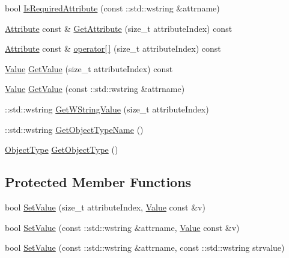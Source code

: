 \begin{DoxyCompactItemize}
\item 
bool \hyperlink{class_c_graph_object_ada27d286c916647eb2b3ec7849e4f16b}{Is\+Required\+Attribute} (const \+::std\+::wstring \&attrname)
\item 
\hyperlink{class_attribute}{Attribute} const \& \hyperlink{class_c_graph_object_a1a249af413ce2325356ef5f9227347ca}{Get\+Attribute} (size\+\_\+t attribute\+Index) const 
\item 
\hyperlink{class_attribute}{Attribute} const \& \hyperlink{class_c_graph_object_a5d8297161392a658c96bea8c8547ca56}{operator\mbox{[}$\,$\mbox{]}} (size\+\_\+t attribute\+Index) const 
\item 
\hyperlink{class_value}{Value} \hyperlink{class_c_graph_object_a3b70297c6692855c1860a826ed31322c}{Get\+Value} (size\+\_\+t attribute\+Index) const 
\item 
\hyperlink{class_value}{Value} \hyperlink{class_c_graph_object_acaecc482dbd4fdc46c50c549041c4306}{Get\+Value} (const \+::std\+::wstring \&attrname)
\item 
\+::std\+::wstring \hyperlink{class_c_graph_object_ab0d003173c2a0ebbd97b72d307c6b1d6}{Get\+W\+String\+Value} (size\+\_\+t attribute\+Index)
\item 
\+::std\+::wstring \hyperlink{class_c_graph_object_afd44cd57cf3abc44bc88499487586a4e}{Get\+Object\+Type\+Name} ()
\item 
\hyperlink{_object_database_defines_8h_a842c5e2e69277690b064bf363c017980}{Object\+Type} \hyperlink{class_c_graph_object_a744507195862d2d4ed6aed9fba55b865}{Get\+Object\+Type} ()
\end{DoxyCompactItemize}
\subsection*{Protected Member Functions}
\begin{DoxyCompactItemize}
\item 
bool \hyperlink{class_c_graph_object_a3d9abce9bd1df44161791c30b1765c0e}{Set\+Value} (size\+\_\+t attribute\+Index, \hyperlink{class_value}{Value} const \&v)
\item 
bool \hyperlink{class_c_graph_object_a338b81319cca78bd9399a9ea8d9517e7}{Set\+Value} (const \+::std\+::wstring \&attrname, \hyperlink{class_value}{Value} const \&v)
\item 
bool \hyperlink{class_c_graph_object_a419e59acb846c8b9e7d29bfc6e4b8e8d}{Set\+Value} (const \+::std\+::wstring \&attrname, const \+::std\+::wstring strvalue)
\end{DoxyCompactItemize}


